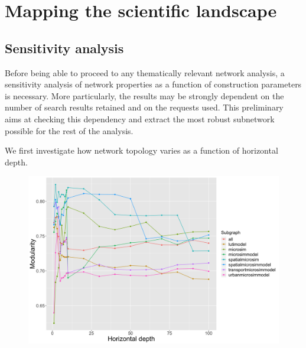 \section*{Mapping the scientific landscape}

\subsection*{Sensitivity analysis}


Before being able to proceed to any thematically relevant network analysis, a sensitivity analysis of network properties as a function of construction parameters is necessary. More particularly, the results may be strongly dependent on the number of search results retained and on the requests used. This preliminary aims at checking this dependency and extract the most robust subnetwork possible for the rest of the analysis.

We first investigate how network topology varies as a function of horizontal depth.


\begin{figure}
    \centering
    \includegraphics[width=\linewidth]{figures/sensitivity_fullnw_hdmax100_subnws_modularity.png}
    \caption{}
    \label{fig:modularity-hdepth}
\end{figure}


